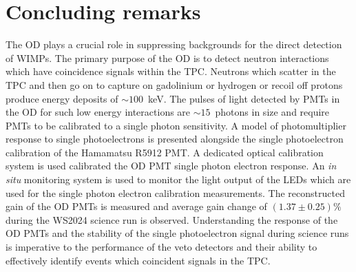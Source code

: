 \pagebreak

\section{Concluding remarks}
The OD plays a crucial role in suppressing backgrounds for the direct detection of WIMPs. The primary purpose of the OD is to detect neutron interactions which have coincidence signals within the TPC. Neutrons which scatter in the TPC and then go on to capture on gadolinium or hydrogen or recoil off protons produce energy deposits of $\sim100$~keV. The pulses of light detected by PMTs in the OD for such low energy interactions are $\sim15$~photons in size and require PMTs to be calibrated to a single photon sensitivity. A model of photomultiplier response to single photoelectrons is presented alongside the single photoelectron calibration of the Hamamatsu R5912 PMT. A dedicated optical calibration system is used calibrated the OD PMT single photon electron response. An \textit{in situ} monitoring system is used to monitor the light output of the LEDs which are used for the single photon electron calibration measurements. The reconstructed gain of the OD PMTs is measured and average gain change of $(1.37\pm0.25)\%$ during the WS2024 science run is observed. Understanding the response of the OD PMTs and the stability of the single photoelectron signal during science runs is imperative to the performance of the veto detectors and their ability to effectively identify events which coincident signals in the TPC.